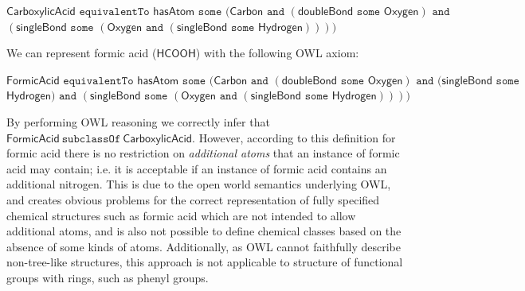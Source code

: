 \documentclass[10pt]{bmc_article}
\newenvironment{bmcformat}{\baselineskip20pt\sloppy\setboolean{publ}{false}}{\baselineskip20pt\sloppy}
\begin{document}
\begin{bmcformat}
\noindent $\mathsf{CarboxylicAcid} \texttt{ equivalentTo } \mathsf{hasAtom} \texttt{ some } 
	(\mathsf{Carbon} \texttt{ and } (\mathsf{doubleBond} \texttt{ some } \mathsf{Oxygen}) 
	    \texttt{ and }$ \\ \hspace*{24mm}$(\mathsf{singleBond} \texttt{ some } (\mathsf{Oxygen} \texttt{ and } (\mathsf{singleBond} \texttt{ some } \mathsf{Hydrogen}))))$

\noindent We can represent formic acid ($\mathsf{HCOOH}$) with the following OWL axiom:

\noindent $\mathsf{FormicAcid} \texttt{ equivalentTo } \mathsf{hasAtom} \texttt{ some } 
	( \mathsf{Carbon} \texttt{ and } (\mathsf{doubleBond} \texttt{ some } \mathsf{Oxygen}) \texttt{ and } (\mathsf{singleBond} \texttt{ some }$
	 \\ \hspace*{24mm}$ \mathsf{Hydrogen}) \texttt{ and } (\mathsf{singleBond} \texttt{ some } (\mathsf{Oxygen} \texttt{ and } (\mathsf{singleBond} \texttt{ some } \mathsf{Hydrogen}))))$
  
\noindent By performing OWL reasoning we correctly infer that $\mathsf{FormicAcid}~ \texttt{subclassOf}~ \mathsf{CarboxylicAcid}$. However, according to this definition for formic acid there is no restriction on \textit{additional atoms} that an instance of formic acid may contain; i.e. it is acceptable if an instance of formic acid contains an additional nitrogen. This is due to the open world semantics underlying OWL, and creates obvious problems for the correct representation of fully specified chemical structures such as formic acid which are not intended to allow additional atoms, and is also not possible to define chemical classes based on the absence of some kinds of atoms. Additionally, as OWL cannot faithfully describe non-tree-like structures, this approach is not applicable to structure of functional groups with rings, such as phenyl groups. 


\end{bmcformat}
\end{document}
